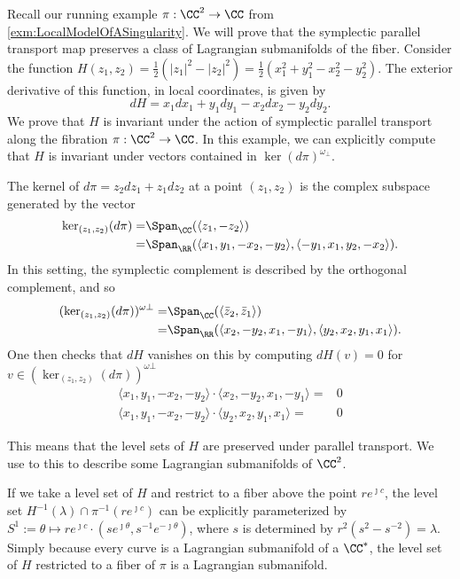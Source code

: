 

    Recall our running example $\pi:\CC^2\to \CC$ from \cref{exm:LocalModelOfASingularity}. 
    We will prove that the symplectic parallel transport map preserves a class of Lagrangian submanifolds of the fiber.
    Consider the function $H(z_1, z_2)= \frac{1}{2}\left(|z_1|^2-|z_2|^2\right)=\frac{1}{2}\left( x_1^2+y_1^2-x_2^2-y_2^2\right)$. 
    The exterior derivative of this function, in local coordinates, is given by 
    \[dH= x_1dx_1 +y_1dy_1 -x_2dx_2- y_2dy_2.\]
    We prove that $H$ is invariant under the action of symplectic parallel transport along the fibration $\pi:\CC^2\to \CC$. 
    In this example, we can explicitly compute that $H$ is invariant under vectors contained in $\ker(d\pi)^{\omega_\bot}$. 
    
    The kernel of $d\pi=z_2dz_1+z_1dz_2$ at a point $(z_1, z_2)$ is the complex subspace generated by the vector \begin{align*}
        \ker_{(z_1, z_2)}(d\pi)=&\Span_\CC(\langle z_1, -z_2\rangle)\\
        =&\Span_\RR(\langle x_1, y_1, -x_2, -y_2\rangle, \langle -y_1, x_1, y_2, -x_2\rangle ).
    \end{align*}
    In this setting, the symplectic complement is described by the orthogonal complement, and so 
    \begin{align*}
        (\ker_{(z_1, z_2)}(d\pi))^{\omega\bot}=&\Span_\CC(\langle \bar z_2, \bar z_1\rangle)\\
        =&\Span_\RR(\langle x_2, -y_2, x_1, -y_1\rangle, \langle y_2, x_2, y_1, x_1\rangle ).
    \end{align*}
    One then checks that $dH$ vanishes on this by computing $dH(v)=0$ for $v\in (\ker_{(z_1, z_2)}(d\pi))^{\omega\bot}$
    \begin{align*}
        \langle x_1, y_1, -x_2,- y_2\rangle\cdot \langle x_2, -y_2, x_1, -y_1\rangle=&0\\
        \langle x_1, y_1, -x_2,-y_2\rangle\cdot \langle y_2, x_2, y_1, x_1 \rangle=&0
    \end{align*}

    This means that the level sets of $H$ are preserved under parallel transport.
    We use to this to describe some Lagrangian submanifolds of $\CC^2$. 

    If we take a level set of $H$ and restrict to a fiber above the point $re^{\jmath c}$, the level set $H^{-1}(\lambda)\cap \pi^{-1}(re^{\jmath c})$ can be explicitly parameterized by $S^1:=\theta\mapsto re^{\jmath c}\cdot(s e^{\jmath\theta}, s^{-1} e^{-\jmath\theta})$, where $s$ is determined by $r^2(s^2-s^{-2})=\lambda$. 
    Simply because every curve is a Lagrangian submanifold of a $\CC^*$, the level set of $H$ restricted to a fiber of $\pi$ is a Lagrangian submanifold.
    
